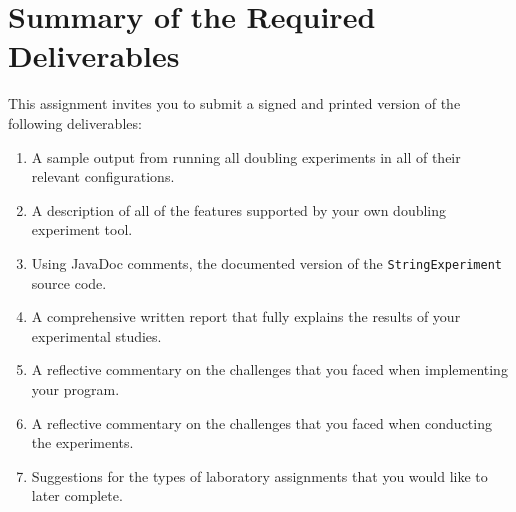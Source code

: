 
\section*{Summary of the Required Deliverables}

This assignment invites you to submit a signed and printed version of the following deliverables:

\begin{enumerate}

  \itemsep0in

  \item A sample output from running all doubling experiments in all of their relevant configurations.

  \item A description of all of the features supported by your own doubling experiment tool.

  \item Using JavaDoc comments, the documented version of the {\tt StringExperiment} source code.

  \item A comprehensive written report that fully explains the results of your experimental studies.

  \item A reflective commentary on the challenges that you faced when implementing your program.

  \item A reflective commentary on the challenges that you faced when conducting the experiments.

  \item Suggestions for the types of laboratory assignments that you would like to later complete.

\end{enumerate}

